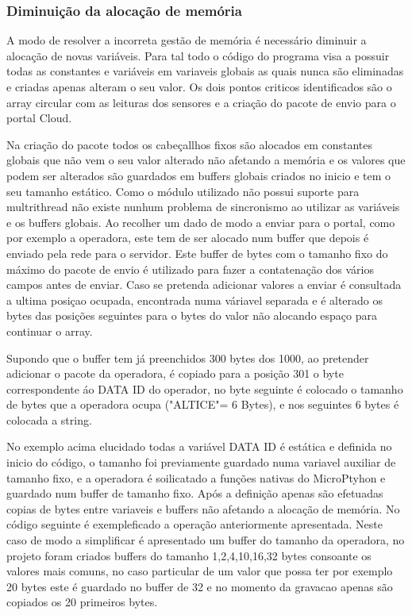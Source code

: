 \subsubsection {Diminuição da alocação de memória}

\par A modo de resolver a incorreta gestão de memória é necessário diminuir a alocação de novas variáveis. Para tal todo o código do programa visa a possuir todas as constantes e variáveis em variaveis globais as quais nunca são eliminadas e criadas apenas alteram o seu valor. Os dois pontos criticos identificados são o array circular com as leituras dos sensores e a criação do pacote de envio para o portal Cloud.
\par Na criação do pacote todos os cabeçallhos fixos são alocados em constantes globais que não vem o seu valor alterado não afetando a memória e os valores que podem ser alterados são guardados em buffers globais criados no inicio e tem o seu tamanho estático. Como o módulo utilizado não possui suporte para multrithread não existe nunhum problema de sincronismo ao utilizar as variáveis e os buffers globais. Ao recolher um dado de modo a enviar para o portal, como por exemplo a operadora, este tem de ser alocado num buffer que depois é enviado pela rede para o servidor. Este buffer de bytes com o tamanho fixo do máximo do pacote de envio é utilizado para fazer a contatenação dos vários campos antes de enviar. Caso se pretenda adicionar valores a enviar é consultada a ultima posiçao ocupada, encontrada numa váriavel separada e é alterado os bytes das posições seguintes para o bytes do valor não alocando espaço para continuar o array.
\par Supondo que o buffer tem já preenchidos 300 bytes dos 1000, ao pretender adicionar o pacote da operadora, é copiado para a posição 301 o byte correspondente áo DATA ID do operador, no byte seguinte é colocado o tamanho de bytes que a operadora ocupa ("ALTICE"= 6 Bytes), e nos seguintes 6 bytes é colocada a string.
\par No exemplo acima elucidado todas a variável DATA ID é estática e definida no inicio do código, o tamanho foi previamente guardado numa variavel auxiliar de tamanho fixo, e a operadora é soilicatado a funções nativas do MicroPtyhon  e guardado num buffer de tamanho fixo. Após a definição apenas são efetuadas copias de bytes entre variaveis e buffers não afetando a alocação de memória. No código seguinte é exempleficado  a operação anteriormente apresentada. Neste caso de modo a simplificar é apresentado um buffer do tamanho da operadora, no projeto foram criados buffers do tamanho 1,2,4,10,16,32 bytes consoante os valores mais comuns, no caso particular de um valor que possa ter por exemplo 20 bytes este é guardado no buffer de 32 e no momento da gravacao apenas são copiados os 20 primeiros bytes.

